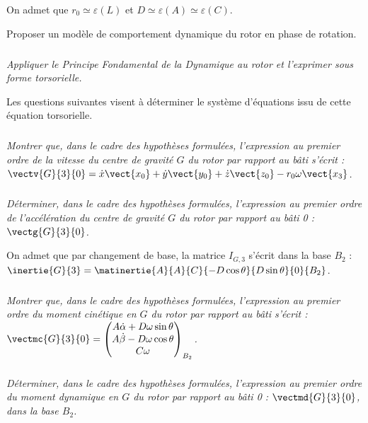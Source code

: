 \begin{multicols}{2}
On admet que $r_0\simeq \varepsilon(L)$ et $D\simeq \varepsilon(A)\simeq \varepsilon(C)$.

\begin{obj}
Proposer un modèle de comportement dynamique du rotor en phase de rotation.
\end{obj}

\subparagraph{}
\textit{Appliquer le Principe Fondamental de la Dynamique au rotor et l'exprimer
sous forme torsorielle.}
\ifprof
\begin{corrige}
\end{corrige}
\else
\fi



Les questions suivantes visent à déterminer le système d'équations issu de cette
équation torsorielle.

\subparagraph{}
\textit{Montrer que, dans le cadre des hypothèses formulées, l'expression au
premier ordre de la vitesse du centre de gravité $G$ du rotor par rapport au bâti
s'écrit : $\vectv{G}{3}{0}=\dot{x}\vect{x_0}+\dot{y}\vect{y_0}+\dot{z}\vect{z_0}-r_0\omega \vect{x_3}$.}
\ifprof
\begin{corrige}
\end{corrige}
\else
\fi


\subparagraph{}
\textit{Déterminer, dans le cadre des hypothèses formulées, l'expression au premier
ordre de l'accélération du centre de gravité $G$ du rotor par rapport au
bâti 0 : $\vectg{G}{3}{0}$.}
\ifprof
\begin{corrige}
\end{corrige}
\else
\fi

On admet que par changement de base, la matrice $I_{G,3}$ s'écrit dans la base $B_2$ :
$\inertie{G}{3}=\matinertie{A}{A}{C}{-D\cos\theta}{D\sin\theta}{0}{B_2}$.



\subparagraph{}
\textit{Montrer que, dans le cadre des hypothèses formulées, l'expression au
premier ordre du moment cinétique en $G$ du rotor par rapport au bâti s'écrit :
$\vectmc{G}{3}{0}=\begin{pmatrix} A\dot{\alpha}+D\omega\sin\theta  \\ A\dot{ \beta }-D\omega\cos\theta \\ C\omega \end{pmatrix}_{B_2}$.
}
\ifprof
\begin{corrige}
\end{corrige}
\else
\fi


\subparagraph{}
\textit{Déterminer, dans le cadre des hypothèses formulées, l'expression au premier
ordre du moment dynamique en $G$ du rotor par rapport au bâti 0 : $\vectmd{G}{3}{0}$, dans la base $B_2$.}
\ifprof
\begin{corrige}
\end{corrige}
\else
\fi


\end{multicols}
